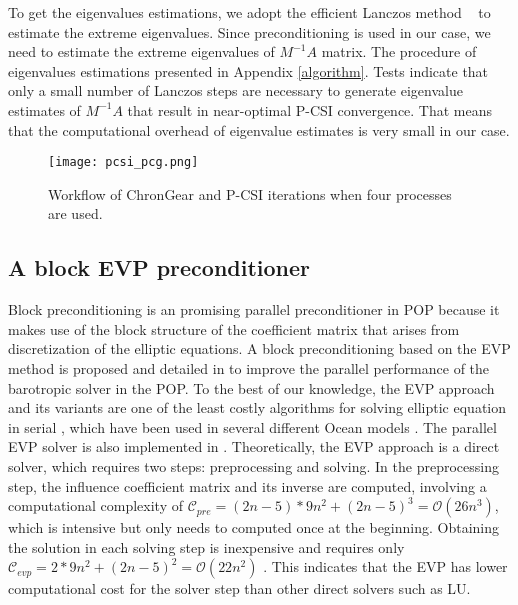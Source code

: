 To get the eigenvalues estimations, we adopt the efficient Lanczos method ~\citep{Paige1980235} to estimate the extreme eigenvalues.
Since preconditioning is used in our case, we need to estimate the extreme eigenvalues of $M^{-1}A$ matrix.
The procedure of eigenvalues estimations presented in Appendix \ref{algorithm}.
Tests indicate that only a small number of Lanczos steps are necessary to generate eigenvalue estimates of $M^{-1}A$ that result in near-optimal P-CSI convergence. That means that the computational overhead of eigenvalue estimates  is very small in our case.

\begin {figure}[!htbp]
\begin{center}
\texttt{[image: pcsi\_pcg.png]}
\caption []{Workflow of ChronGear and P-CSI iterations when four processes are used. \label{fig:pcsi_pcg}}
\end{center}
\end {figure}


\subsection{A block EVP preconditioner} \label{se:evp}
Block preconditioning is an promising parallel preconditioner in POP because it makes use of the block structure of the coefficient matrix that arises from discretization of the elliptic equations.
A block preconditioning based on the EVP method is proposed and detailed in \citet{hu2015improving} to improve the parallel performance of the barotropic solver in the POP.
To the best of our knowledge, the EVP approach and its variants are one of the least costly algorithms for solving elliptic equation in serial \citep{roache1995elliptic},
which have been used in several different Ocean models \citep{dietrich1987ocean,sheng1998candie,tseng2011parallel}. The parallel EVP solver is also implemented in \citet{tseng2011parallel}.
Theoretically, the EVP approach is a direct solver, which requires two steps: preprocessing and solving.
In the preprocessing step, the influence coefficient matrix and its inverse are computed, involving a computational complexity of $\mathcal{C}_{pre} = (2n-5)* 9n^2 + (2n-5)^3 = \mathcal {O} (26n^3)$, which is intensive but only needs to computed once at the beginning.
Obtaining the solution in each solving step is inexpensive and requires only $\mathcal{C}_{evp}= 2* 9n^2 + (2n-5)^2 = \mathcal{O} (22n^2)$ \citep{hu2015improving}.
This indicates that the EVP has lower computational cost for the solver step than other direct solvers such as LU.

